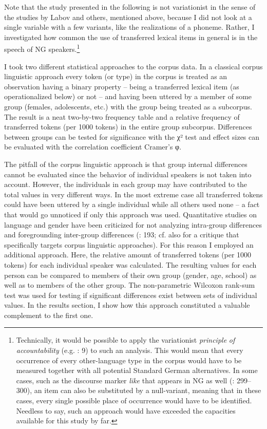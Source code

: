 \documentclass[output=paper]{langsci/langscibook}
\begin{document}
Note that the study presented in the following is not variationist in the sense of the studies by Labov and others, mentioned above, because I did not look at a single variable with a few variants, like the realizations of a phoneme. Rather, I investigated how common the use of transferred lexical items in general is in the speech of NG speakers.\footnote{Technically, it would be possible to apply the variationist \textit{principle} \textit{of} \textit{accountability} (e.g. \citealt{tagliamonte_variationist_2012}: 9) to such an analysis. This would mean that every occurrence of every other-language type in the corpus would have to be measured together with all potential Standard German alternatives. In some cases, such as the discourse marker \textit{like} \citep[270]{tagliamonte_variationist_2012} that appears in NG as well (\citealt{wiese_deutsch_2014}: 299--300), an item can also be substituted by a null-variant, meaning that in these cases, every single possible place of occurrence would have to be identified. Needless to say, such an approach would have exceeded the capacities available for this study by far.}

I took two different statistical approaches to the corpus data. In a classical corpus linguistic approach every token (or type) in the corpus is treated as an observation having a binary property – being a transferred lexical item (as operationalized below) or not – and having been uttered by a member of some group (females, adolescents, etc.) with the group being treated as a subcorpus. The result is a neat two-by-two frequency table and a relative frequency of transferred tokens (per 1000 tokens) in the entire group subcorpus. Differences between groups can be tested for significance with the χ² test and effect sizes can be evaluated with the correlation coefficient Cramer’s φ.

The pitfall of the corpus linguistic approach is that group internal differences cannot be evaluated since the behavior of individual speakers is not taken into account. However, the individuals in each group may have contributed to the total values in very different ways. In the most extreme case all transferred tokens could have been uttered by a single individual while all others used none – a fact that would go unnoticed if only this approach was used. Quantitative studies on language and gender have been criticized for not analyzing intra-group differences and foregrounding inter-group differences (\citealt{eckert_new_1999}: 193; cf. also \citealt{baker_using_2014} for a critique that specifically targets corpus linguistic approaches). For this reason I employed an additional approach. Here, the relative amount of transferred tokens (per 1000 tokens) for each individual speaker was calculated. The resulting values for each person can be compared to members of their own group (gender, age, school) as well as to members of the other group. The non-parametric Wilcoxon rank-sum test was used for testing if significant differences exist between sets of individual values. In the results section, I show how this approach constituted a valuable complement to the first one.
\end{document}
